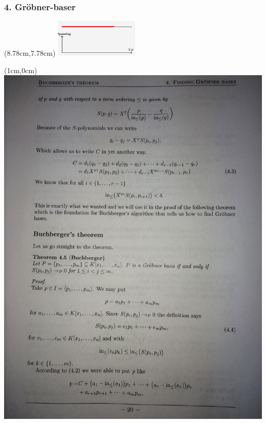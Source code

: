 \documentclass[10pt,notheorems,xcolor=pdftex,dvipsnames,table]{beamer}
\renewcommand{\{}{\left\lbrace}
\renewcommand{\}}{\right\rbrace}
\begin{document}
\begin{frame}[t]
\frametitle{
		\LARGE{4. Gröbner-baser}}
				\begin{textblock*}{0.1cm}(8.78cm,7.78cm)  
					\includegraphics[width=4cm]{disposition/d16.jpg}
				\end{textblock*}				
				\begin{textblock*}{0.85cm}(1cm,0cm)
					\includegraphics[scale=0.087]{3.jpg}
				\end{textblock*}				
\end{frame}
\end{document}
